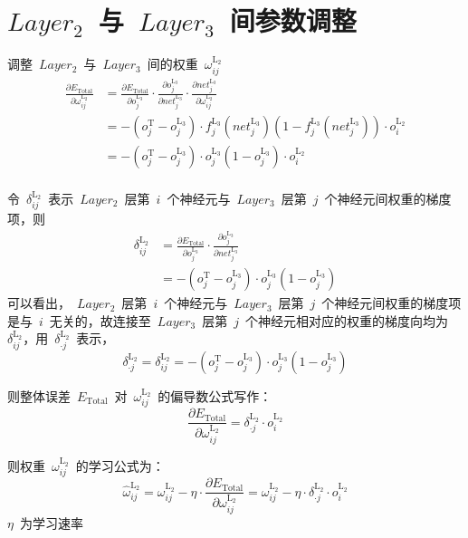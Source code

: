 \documentclass[a4paper, UTF8, heading = true, scheme = chinese, linespread = 1.66, titlepage]{ctexart}
\begin{document}
\section{$Layer_2$~与~$Layer_3$~间参数调整}
调整~$Layer_2$~与~$Layer_3$~间的权重~$\omega^{\text{L}_2}_{ij}$
\begin{align}
\frac{\partial E_{\text{Total}}}{\partial \omega^{\text{L}_2}_{ij}}
&=
\frac{\partial E_{\text{Total}}}{\partial o^{\text{L}_3}_{j}} \cdot \frac{\partial o^{\text{L}_3}_{j}}{\partial net^{\text{L}_3}_{j}} \cdot \frac{\partial net^{\text{L}_3}_{j}}{\partial \omega^{\text{L}_2}_{ij}} \\
&=
-(o^{\text{T}}_{j} - o^{\text{L}_3}_{j}) \cdot f^{\text{L}_3}_{j}{(net^{\text{L}_3}_j)}(1 - f^{\text{L}_3}_{j}{(net^{\text{L}_3}_j)}) \cdot o^{\text{L}_2}_{i} \\
&=
-(o^{\text{T}}_{j} - o^{\text{L}_3}_{j}) \cdot o^{\text{L}_3}_{j}(1 - o^{\text{L}_3}_{j}) \cdot o^{\text{L}_2}_{i} \\
\end{align}

令~$\delta^{\text{L}_2}_{ij}$~表示~$Layer_2$~层第~$i$~个神经元与~$Layer_3$~层第~$j$~个神经元间权重的梯度项，则
\begin{align}
\delta^{\text{L}_2}_{ij} &= \frac{\partial E_{\text{Total}}}{\partial o^{\text{L}_3}_{j}} \cdot \frac{\partial o^{\text{L}_3}_{j}}{\partial net^{\text{L}_3}_{j}} \\
&= -(o^{\text{T}}_{j} - o^{\text{L}_3}_{j}) \cdot o^{\text{L}_3}_{j}(1 - o^{\text{L}_3}_{j})
\end{align}
可以看出，~$Layer_2$~层第~$i$~个神经元与~$Layer_3$~层第~$j$~个神经元间权重的梯度项是与~$i$~无关的，故连接至~$Layer_3$~层第~$j$~个神经元相对应的权重的梯度向均为~$\delta^{\text{L}_2}_{ij}$，用~$\delta^{\text{L}_2}_{\cdot j}$~表示，
\begin{equation}
\delta^{\text{L}_2}_{\cdot j} = \delta^{\text{L}_2}_{ij} = -(o^{\text{T}}_{j} - o^{\text{L}_3}_{j}) \cdot o^{\text{L}_3}_{j}(1 - o^{\text{L}_3}_{j})
\end{equation}

则整体误差~$E_{\text{Total}}$~对~$\omega^{\text{L}_2}_{ij}$~的偏导数公式写作：
\begin{equation}
\frac{\partial E_{\text{Total}}}{\partial \omega^{\text{L}_2}_{ij}}
= \delta^{\text{L}_2}_{\cdot j} \cdot o^{\text{L}_2}_{i}
\end{equation}

则权重~$\omega^{\text{L}_2}_{ij}$~的学习公式为：
\begin{equation}
\widehat{\omega}^{\text{L}_2}_{ij} = \omega^{\text{L}_2}_{ij} - \eta \cdot \frac{\partial E_{\text{Total}}}{\partial \omega^{\text{L}_2}_{ij}} 
= \omega^{\text{L}_2}_{ij} - \eta \cdot \delta^{\text{L}_2}_{\cdot j} \cdot o^{\text{L}_2}_{i}
\end{equation}
$\eta$~为学习速率
\end{document}

